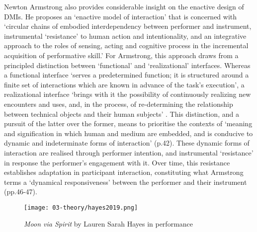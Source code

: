 Newton Armstrong also provides considerable insight on the enactive design of DMIs. He proposes an `enactive model of interaction' that is concerned with `circular chains of embodied interdependency between performer and instrument, instrumental `resistance' to human action and intentionality, and an integrative approach to the roles of sensing, acting and cognitive process in the incremental acquisition of performative skill.' For Armstrong, this approach draws from a principled distinction between `functional' and `realizational' interfaces. Whereas a functional interface `serves a predetermined function; it is structured around a finite set of interactions which are known in advance of the task's execution', a realizational interface `brings with it the possibility of continuously realizing new encounters and uses, and, in the process, of re-determining the relationship between technical objects and their human subjects' \citep[p. v]{armstrong2006}. This distinction, and a pursuit of the latter over the former, means to prioritise the contexts of `meaning and signification in which human and medium are embedded, and is conducive to dynamic and indeterminate forms of interaction' (p.42). These dynamic forms of interaction are realised through performer intention, and instrumental `resistance' in response the performer's engagement with it. Over time, this resistance establishes adaptation in participant interaction, constituting what Armstrong terms a `dynamical responsiveness' between the performer and their instrument (pp.46-47). 

\begin{wrapfigure}{r}{0.45\textwidth}
    \vspace{-\intextsep}
    \hfill
    \begin{minipage}{0.95\linewidth}
        \texttt{[image: 03-theory/hayes2019.png]}
        \captionsetup{justification=justified}
        \caption{\textit{Moon via Spirit} by Lauren Sarah Hayes in performance \citep[taken by][]{slater2019}}\label{fig: slater2019}
    \end{minipage}
\end{wrapfigure}

